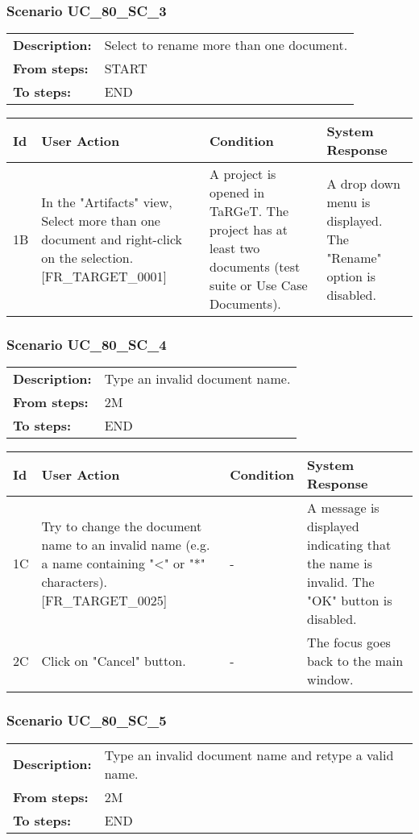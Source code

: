 \documentclass[a4paper,11pt]{article}
\newcommand{\bl}{\\ \hline}
\begin{document}
\subsubsection*{Scenario UC_80_SC_3}
\begin{tabular}{p{1in}p{4in}}
{\bf Description:} & Select to rename more than one document. \\
{\bf From steps:} & START \\
{\bf To steps:} & END \\
\end{tabular}
 
\begin{tabular}{|p{0.8in}|p{1.6in}|p{1.6in}|p{1.6in}|}
\hline
Id & User Action & Condition & System Response  \bl 
1B & In the "Artifacts" view, Select more than one document and right-click on the selection. [FR_TARGET_0001] & A project is opened in TaRGeT. The project has at least two documents (test suite or Use Case Documents). & A drop down menu is displayed. The "Rename" option is disabled. \bl 
\end{tabular}
\subsubsection*{Scenario UC_80_SC_4}
\begin{tabular}{p{1in}p{4in}}
{\bf Description:} & Type an invalid document name. \\
{\bf From steps:} & 2M \\
{\bf To steps:} & END \\
\end{tabular}
 
\begin{tabular}{|p{0.8in}|p{1.6in}|p{1.6in}|p{1.6in}|}
\hline
Id & User Action & Condition & System Response  \bl 
1C & Try to change the document name to an invalid name (e.g. a name containing "<" or "*" characters). [FR_TARGET_0025] & - & A message is displayed indicating that the name is invalid. The "OK" button is disabled. \bl 
2C & Click on "Cancel" button. & - & The focus goes back to the main window. \bl 
\end{tabular}
\subsubsection*{Scenario UC_80_SC_5}
\begin{tabular}{p{1in}p{4in}}
{\bf Description:} & Type an invalid document name and retype a valid name. \\
{\bf From steps:} & 2M \\
{\bf To steps:} & END \\
\end{tabular}
 
\end{document}
